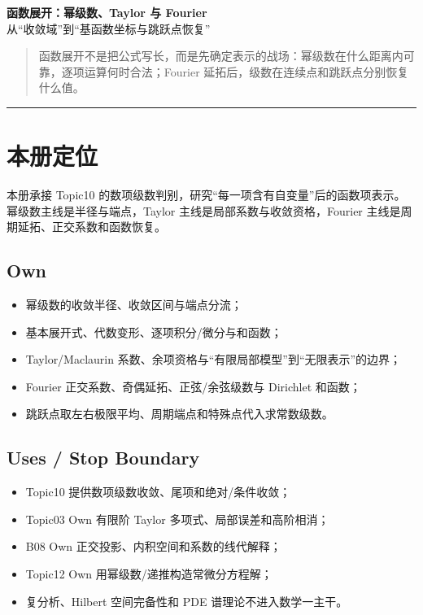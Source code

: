 \documentclass[11pt,a4paper,fontset=fandol]{ctexart}
\begin{document}
\begin{center}
{\LARGE\textbf{函数展开：幂级数、Taylor 与 Fourier}}\\[0.4em]
{\large 从“收敛域”到“基函数坐标与跳跃点恢复”}
\end{center}
\vspace{0.4em}
\begin{quote}
函数展开不是把公式写长，而是先确定表示的战场：幂级数在什么距离内可靠，逐项运算何时合法；Fourier 延拓后，级数在连续点和跳跃点分别恢复什么值。
\end{quote}
\begin{center}\rule{0.5\linewidth}{0.5pt}\end{center}

\setcounter{section}{-1}
\section{本册定位}
本册承接 Topic10 的数项级数判别，研究“每一项含有自变量”后的函数项表示。幂级数主线是半径与端点，Taylor 主线是局部系数与收敛资格，Fourier 主线是周期延拓、正交系数和函数恢复。

\subsection{Own}
\begin{itemize}
  \item 幂级数的收敛半径、收敛区间与端点分流；
  \item 基本展开式、代数变形、逐项积分/微分与和函数；
  \item Taylor/Maclaurin 系数、余项资格与“有限局部模型”到“无限表示”的边界；
  \item Fourier 正交系数、奇偶延拓、正弦/余弦级数与 Dirichlet 和函数；
  \item 跳跃点取左右极限平均、周期端点和特殊点代入求常数级数。
\end{itemize}

\subsection{Uses / Stop Boundary}
\begin{itemize}
  \item Topic10 提供数项级数收敛、尾项和绝对/条件收敛；
  \item Topic03 Own 有限阶 Taylor 多项式、局部误差和高阶相消；
  \item B08 Own 正交投影、内积空间和系数的线代解释；
  \item Topic12 Own 用幂级数/递推构造常微分方程解；
  \item 复分析、Hilbert 空间完备性和 PDE 谱理论不进入数学一主干。
\end{itemize}
\end{document}

